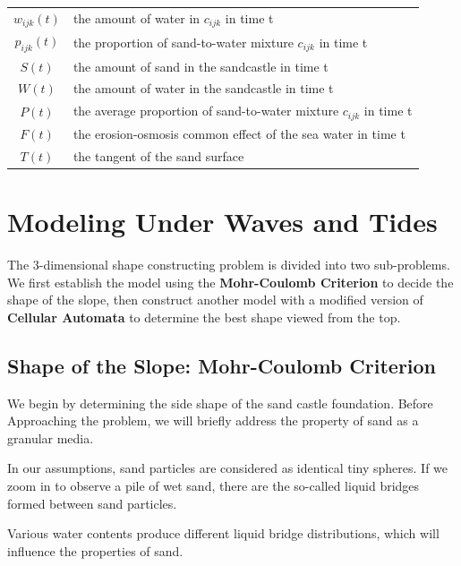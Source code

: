 \documentclass[12pt]{article}
\begin{document}
\begin{table}[H]
\begin{tabular}{cl}
        $w_{ijk}(t)$ & the amount of water in  $c_{ijk}$ in time t                         \\
        $p_{ijk}(t)$ & the proportion of sand-to-water mixture $c_{ijk}$ in time t         \\
        $S(t)$       & the amount of sand in the sandcastle	in time t                       \\
        $W(t)$       & the amount of water in the sandcastle in time t                     \\
        $P(t)$       & the average proportion of sand-to-water mixture $c_{ijk}$ in time t \\
        $F(t)$       & the erosion-osmosis common effect of the sea water in time t        \\
        $T(t)$       & the tangent of the sand surface                                     \\
        \hline
    \end{tabular}
    \label{bs2}
\end{table}

\section{Modeling Under Waves and Tides}
\par
The 3-dimensional shape constructing problem is divided into two sub-problems. We first establish the model using the \textbf{Mohr-Coulomb Criterion} to decide the shape of the slope, then construct another model with a modified version of \textbf{Cellular Automata} to determine the best shape viewed from the top.

\subsection{Shape of the Slope: Mohr-Coulomb Criterion}
We begin by determining the side shape of the sand castle foundation. Before Approaching the problem, we will briefly address the property of sand as a granular media.
\par
In our assumptions, sand particles are considered as identical tiny spheres. If we zoom in to observe a pile of wet sand, there are the so-called liquid bridges formed between sand particles.
\par
Various water contents produce different liquid bridge distributions, which will influence the properties of sand.
\end{document}
